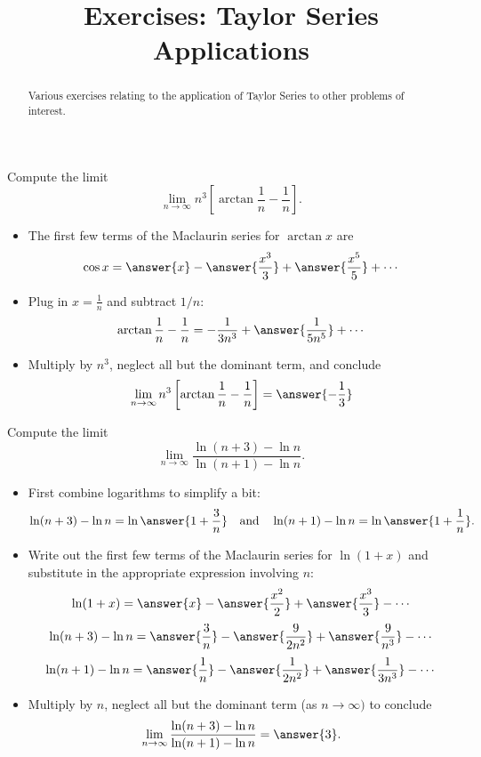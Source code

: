 \documentclass{ximera}
\title{Exercises: Taylor Series Applications}
\begin{document}
\begin{abstract}
Various exercises relating to the application of Taylor Series to other problems of interest.
\end{abstract}
\maketitle

\begin{exercise}
Compute the limit 
\[ \lim_{n \rightarrow \infty} n^3 \left[ \arctan \frac{1}{n} - \frac{1}{n} \right]. \]
\begin{itemize}
\item The first few terms of the Maclaurin series for $\arctan x$ are
\[ \cos x = \answer{x} - \answer{\frac{x^3}{3}} + \answer{\frac{x^5}{5}} + \cdots \]
\item Plug in $x = \frac{1}{n}$ and subtract $1/n$:
\[ \arctan \frac{1}{n} - \frac{1}{n} = - \frac{1}{3n^3} + \answer{\frac{1}{5n^5}} + \cdots \]
\item Multiply by $n^3$, neglect all but the dominant term, and conclude
\[ \lim_{n \rightarrow \infty} n^3 \left[ \arctan \frac{1}{n} - \frac{1}{n} \right] = \answer{-\frac{1}{3}} \]
\end{itemize}
\end{exercise}

\begin{exercise}
Compute the limit
\[ \lim_{n \rightarrow \infty} \frac{\ln (n+3) - \ln n}{\ln (n+1) - \ln n}. \]
\begin{itemize}
\item First combine logarithms to simplify a bit:
\[  \ln (n+3) - \ln n  =  \ln \answer{1 + \frac{3}{n}} \ \ \text{ and } \ \ \ln (n+1) - \ln n  =  \ln \answer{1 + \frac{1}{n}}. \]
\item Write out the first few terms of the Maclaurin series for $\ln (1+x)$ and substitute in the appropriate expression involving $n$:
\[ \ln (1 + x) = \answer{x} - \answer{\frac{x^2}{2}} + \answer{\frac{x^3}{3}} - \cdots \]
\[ \ln (n+3) - \ln n = \answer{ \frac{3}{n}} - \answer{\frac{9}{2n^2}} + \answer{\frac{9}{n^3}} - \cdots \]
\[ \ln (n+1) - \ln n = \answer{\frac{1}{n}} - \answer{\frac{1}{2n^2}} + \answer{\frac{1}{3n^3}} - \cdots \]
\item Multiply by $n$, neglect all but the dominant term (as $n \rightarrow \infty)$ to conclude
\[ \lim_{n \rightarrow \infty} \frac{\ln (n+3) - \ln n}{\ln (n+1) - \ln n} = \answer{3}. \]
\end{itemize}
\end{exercise}
\end{document}
